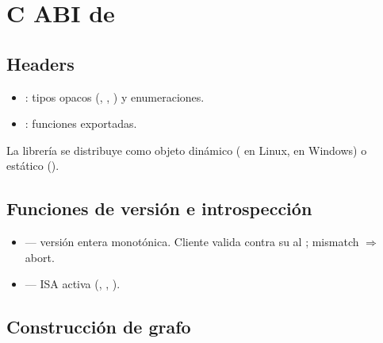\chapter{C ABI de }
\label{sec:cabi}

\section{Headers}

\begin{itemize}
    \item {}:
    tipos opacos (, ,
    ) y enumeraciones.
    \item {}:
    funciones exportadas.
\end{itemize}

La librería se distribuye como objeto dinámico
( en Linux,
 en Windows) o estático
().

\section{Funciones de versión e introspección}

\begin{itemize}
    \item {} — versión entera
    monotónica. Cliente valida contra su 
    al ; mismatch $\Rightarrow$ abort.
    \item {} — ISA activa
    (, , ).
\end{itemize}

\section{Construcción de grafo}

